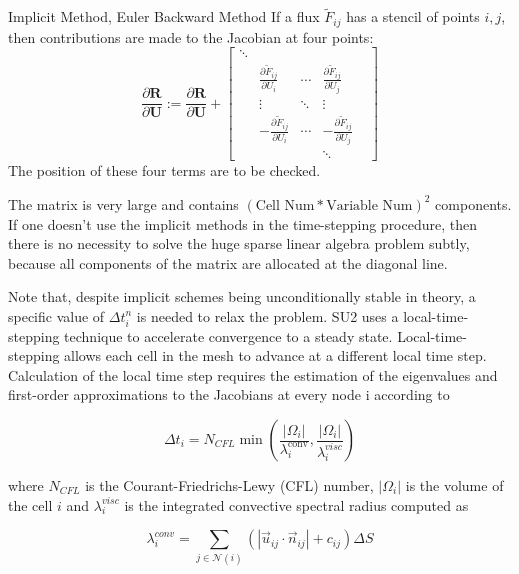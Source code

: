 \begin{frame}[allowframebreaks]{Implicit Method, Euler Backward Method}
If a flux $\tilde{F}_{i j}$ has a stencil of points
${i,j}$, then contributions are made to the Jacobian at four points:
\begin{equation}
\frac{\partial \boldsymbol{R}}{\partial \boldsymbol{U}} :=\frac{\partial \boldsymbol{R}}{\partial \boldsymbol{U}}+\left[\begin{array}{ccccc}{\ddots} & {} & {} & {} & {} \\ {} & {\frac{\partial \tilde{F}_{i j}}{\partial U_{i}}} & {\cdots} & {\frac{\partial \tilde{F}_{i j}}{\partial U_{j}}} \\ {} & {\vdots} & {\ddots} & {\vdots} \\ {} & {-\frac{\partial \tilde{F}_{i j}}{\partial U_{i}}} & {\cdots} & {-\frac{\partial \tilde{F}_{i j}}{\partial U_{j}}} \\ {} & {} & {} & {\ddots}\end{array}\right]
\end{equation}
The position of these four terms are to be checked.


The matrix is very large and contains $(\text{Cell Num} * \text{Variable Num})^2$ components. If one doesn't use the implicit methods in the time-stepping procedure, then there is no necessity to solve the huge sparse linear algebra problem subtly, because all components of the matrix are allocated at the diagonal line.  

Note that, despite implicit schemes being unconditionally stable in theory, a specific value of $\Delta t_i^n$ is needed
to relax the problem. SU2 uses a local-time-stepping technique to accelerate convergence to a steady state.
Local-time-stepping allows each cell in the mesh to advance at a different local time step. Calculation of the
local time step requires the estimation of the eigenvalues and first-order approximations to the Jacobians at
every node i according to

\begin{equation}
\Delta t_{i}=N_{C F L} \min \left(\frac{\left|\Omega_{i}\right|}{\lambda_{i}^{\operatorname{conv}}}, \frac{\left|\Omega_{i}\right|}{\lambda_{i}^{v i s c}}\right)
\end{equation}

where $N_{CFL}$ is the Courant-Friedrichs-Lewy (CFL) number, $\left|\Omega_{i}\right|$ is the volume of the cell $i$ and $\lambda_{i}^{v i s c}$
is the integrated convective spectral radius computed as

\begin{equation}
\lambda_{i}^{c o n v}=\sum_{j \in \mathcal{N}(i)}\left(\left|\vec{u}_{i j} \cdot \vec{n}_{i j}\right|+c_{i j}\right) \Delta S
\end{equation}


\end{frame}
